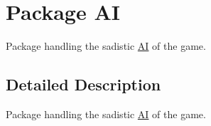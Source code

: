 \hypertarget{namespace_a_i}{\section{Package A\-I}
\label{namespace_a_i}
}


Package handling the sadistic \hyperlink{namespace_a_i}{A\-I} of the game.  




\subsection{Detailed Description}
Package handling the sadistic \hyperlink{namespace_a_i}{A\-I} of the game. 